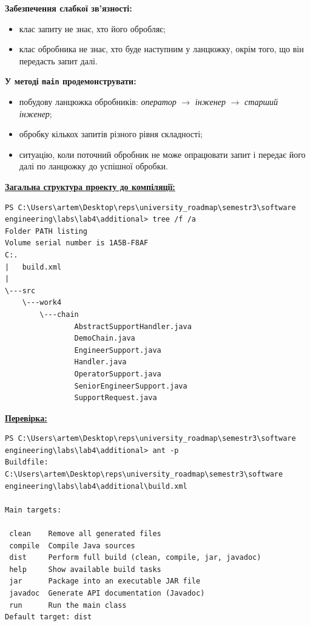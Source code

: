 \documentclass[12pt,a4paper]{article}
\begin{document}
    \textbf{Забезпечення слабкої зв'язності:}
    \begin{itemize}
    \item клас запиту не знає, хто його обробляє;
    \item клас обробника не знає, хто буде наступним у ланцюжку, окрім того, що він передасть запит далі.
    \end{itemize}

    \textbf{У методі \texttt{main} продемонструвати:}
    \begin{itemize}
    \item побудову ланцюжка обробників: \emph{оператор} \(\to\) \emph{інженер} \(\to\) \emph{старший інженер};
    \item обробку кількох запитів різного рівня складності;
    \item ситуацію, коли поточний обробник не може опрацювати запит і передає його далі по ланцюжку до успішної обробки.
    \end{itemize}

    \textbf{\underline{Загальна структура проекту до компіляції:}}

    \begin{verbatim}
PS C:\Users\artem\Desktop\reps\university_roadmap\semestr3\software engineering\labs\lab4\additional> tree /f /a
Folder PATH listing
Volume serial number is 1A5B-F8AF
C:.
|   build.xml
|
\---src
    \---work4
        \---chain
                AbstractSupportHandler.java
                DemoChain.java
                EngineerSupport.java
                Handler.java
                OperatorSupport.java
                SeniorEngineerSupport.java
                SupportRequest.java
    \end{verbatim}

    \textbf{\underline{Перевірка:}}

    \begin{verbatim}
PS C:\Users\artem\Desktop\reps\university_roadmap\semestr3\software engineering\labs\lab4\additional> ant -p 
Buildfile: C:\Users\artem\Desktop\reps\university_roadmap\semestr3\software engineering\labs\lab4\additional\build.xml

Main targets:

 clean    Remove all generated files
 compile  Compile Java sources
 dist     Perform full build (clean, compile, jar, javadoc)
 help     Show available build tasks
 jar      Package into an executable JAR file
 javadoc  Generate API documentation (Javadoc)
 run      Run the main class
Default target: dist
    \end{verbatim}
\end{document}
